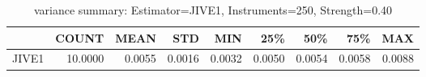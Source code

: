 \begin{table}[ht]
\centering
\caption{variance summary: Estimator=JIVE1, Instruments=250, Strength=0.40}
\begin{tabular}{lrrrrrrrr}
\toprule
 & COUNT & MEAN & STD & MIN & 25\% & 50\% & 75\% & MAX \\
\midrule
JIVE1 & 10.0000 & 0.0055 & 0.0016 & 0.0032 & 0.0050 & 0.0054 & 0.0058 & 0.0088 \\
\bottomrule
\end{tabular}
\end{table}
